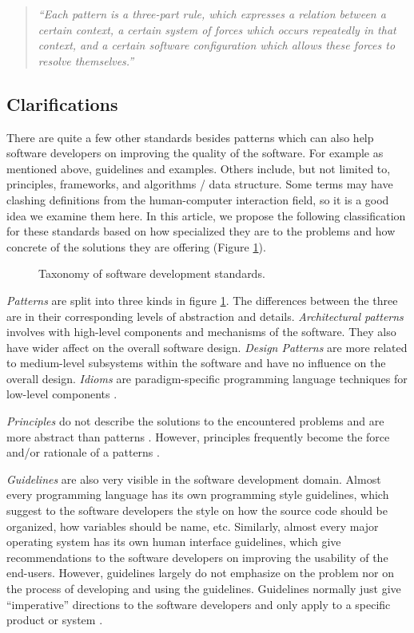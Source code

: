 \documentclass[a4paper,titlepage]{article}
\begin{document}
\begin{quote}
  {\it ``Each pattern is a three-part rule, which expresses a relation
    between a certain context, a certain system of forces which occurs
    repeatedly in that context, and a certain software configuration
    which allows these forces to resolve themselves.''}

  \raggedleft \citet{timeless:gabriel}
\end{quote}

\subsection{Clarifications}
There are quite a few other standards besides patterns which can also
help software developers on improving the quality of the software. For
example as mentioned above, guidelines and examples. Others include,
but not limited to, principles, frameworks, and algorithms / data
structure. Some terms may have clashing definitions from the
human-computer interaction field, so it is a good idea we examine them
here. In this article, we propose the following classification for
these standards based on how specialized they are to the problems and
how concrete of the solutions they are offering (Figure
\ref{fig:standards}).

\begin{figure}[!t]
\centering

\caption{Taxonomy of software development standards.}
\label{fig:standards}
\end{figure}

\textit{Patterns} are split into three kinds in figure
\ref{fig:standards}. The differences between the three are in their
corresponding levels of abstraction and details. \textit{Architectural
  patterns} involves with high-level components and mechanisms of the
software. They also have wider affect on the overall software
design. \textit{Design Patterns} are more related to medium-level
subsystems within the software and have no influence on the overall
design. \textit{Idioms} are paradigm-specific programming language
techniques for low-level components \citep{patterns:buschmann}.

\textit{Principles} do not describe the solutions to the encountered
problems and are more abstract than patterns
\citep{patterns:coplien}. However, principles frequently become the
force and/or rationale of a patterns \citep{patterns:appleton}.

\textit{Guidelines} are also very visible in the software development
domain. Almost every programming language has its own programming
style guidelines, which suggest to the software developers the style
on how the source code should be organized, how variables should be
name, etc. Similarly, almost every major operating system has its own
human interface guidelines, which give recommendations to the software
developers on improving the usability of the end-users. However,
guidelines largely do not emphasize on the problem nor on the process
of developing and using the guidelines. Guidelines normally just give
``imperative'' directions to the software developers and only apply to
a specific product or system \citep{patterns:griffiths}.
\end{document}
